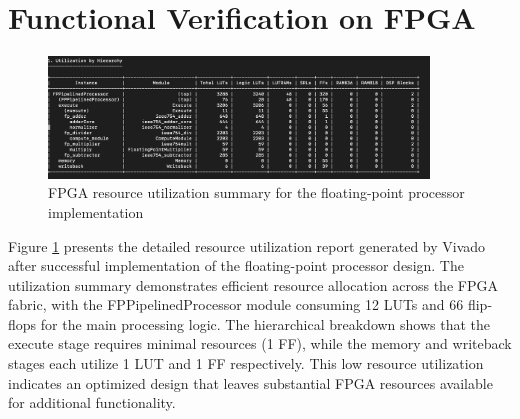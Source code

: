 \section{Functional Verification on FPGA}
\label{sec:functional_verification}

\begin{figure}[htbp]
    \centering
    \includegraphics[width=0.9\textwidth]{figures/UT.png}
    \caption{FPGA resource utilization summary for the floating-point processor implementation}
    \label{fig:utilization_report}
\end{figure}

Figure \ref{fig:utilization_report} presents the detailed resource utilization report generated by Vivado after successful implementation of the floating-point processor design. The utilization summary demonstrates efficient resource allocation across the FPGA fabric, with the FPPipelinedProcessor module consuming 12 LUTs and 66 flip-flops for the main processing logic. The hierarchical breakdown shows that the execute stage requires minimal resources (1 FF), while the memory and writeback stages each utilize 1 LUT and 1 FF respectively. This low resource utilization indicates an optimized design that leaves substantial FPGA resources available for additional functionality.

